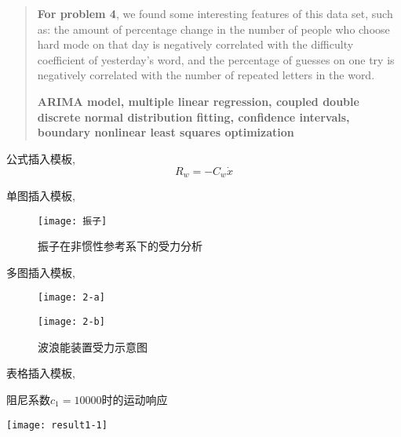 \documentclass[12pt]{mcmthesis}
\begin{document}
\begin{abstract}
\textbf{For problem 4}, we found some interesting features of this data set, such as: the amount of percentage change in the number of people who choose hard mode on that day is negatively correlated with the difficulty coefficient of yesterday's word, and the percentage of guesses on one try is negatively correlated with the number of repeated letters in the word.
\begin{keywords}
\textbf{ARIMA model,  multiple linear regression,  coupled double discrete normal distribution fitting,  confidence intervals,  boundary nonlinear least squares optimization}
\end{keywords}
\end{abstract}
\maketitle
\newpage
\thispagestyle{empty}
\setcounter{tocdepth}{2}
\tableofcontents
\newpage
\setcounter{page}{3}
\iffalse

公式插入模板,
\begin{equation}\label{eq:1x}
	R_w=-C_w\dot{x}
\end{equation}

单图插入模板,
\begin{figure}[h]
	\small
	\centering
	\texttt{[image: 振子]}
	\caption{振子在非惯性参考系下的受力分析} 
	\label{fig:11x}
\end{figure}

多图插入模板,
\begin{figure}[h]
	\centering
	\begin{minipage}[c]{0.32\textwidth}
		\centering
		\texttt{[image: 2-a]}
		\label{figJ_1x}
	\end{minipage}
	\qquad \qquad
	\begin{minipage}[c]{0.35\textwidth}
		\centering
		\texttt{[image: 2-b]}
		\label{figJ_2x}
	\end{minipage}
	\caption{波浪能装置受力示意图}
	\label{fig:2x}
\end{figure}

表格插入模板,
\begin{table}[!htbp]
	\small
	\centering
	\caption{阻尼系数$ c_1=10000 $时的运动响应}
	\texttt{[image: result1-1]}
	\label{tab：1x}
\end{table}
\end{document}
